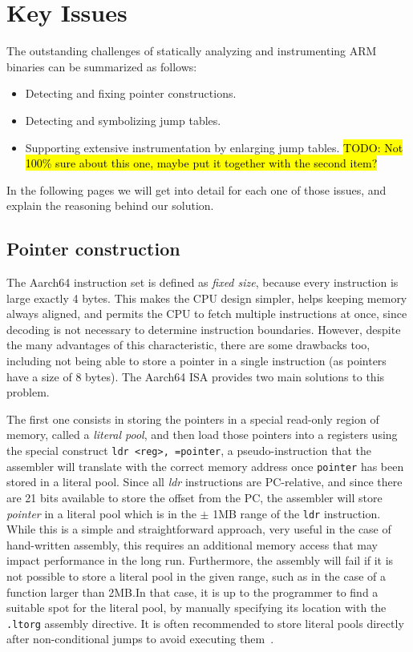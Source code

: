 \documentclass[a4paper,11pt,oneside]{report}
\newcommand{\todo}[1]{%
	\begingroup 
	\sethlcolor{cyan}%
	\hl{TODO: #1}%
	\endgroup
}
\begin{document}
\section{Key Issues}
The outstanding challenges of statically analyzing and instrumenting ARM 
binaries can be summarized as follows:

\begin{itemize}
	\item Detecting and fixing pointer constructions.
	\item Detecting and symbolizing jump tables.
	\item Supporting extensive instrumentation by enlarging jump tables.  
		\todo{Not 100\% sure about this one, maybe put it together with the 
		second item?}
\end{itemize}

In the following pages we will get into detail for each one of those issues, 
and explain the reasoning behind our solution.

\subsection{Pointer construction}
The Aarch64 instruction set is defined as \emph{fixed size}, because every 
instruction is large exactly 4 bytes. This makes the CPU design simpler,
helps keeping memory always aligned, and permits the CPU to fetch multiple 
instructions at once, since decoding is not necessary to determine instruction 
boundaries. However, despite the many advantages of this characteristic, there 
are some drawbacks too, including not being able to store a pointer in a single 
instruction (as pointers have a size of 8 bytes). The Aarch64 ISA provides two 
main solutions to this problem. 

The first one consists in storing the pointers in a special read-only region of 
memory, called a \emph{literal pool}, and then load those pointers into a 
registers using the special construct \texttt{ldr <reg>, =pointer}, a 
pseudo-instruction that the assembler will translate with the correct memory 
address once \texttt{pointer} has been stored in a literal pool.  Since all 
\emph{ldr} instructions are PC-relative, and since there are 21 bits available 
to store the offset from the PC, the assembler will store \emph{pointer} in a 
literal pool which is in the $\pm$ 1MB range of the \texttt{ldr} instruction.  
While this is a simple and straightforward approach, very useful in the case of 
hand-written assembly, this requires an additional memory access that may 
impact performance in the long run. Furthermore, the assembly will fail if it 
is not possible to store a literal pool in the given range, such as in the case 
of a function larger than 2MB.\@ In that case, it is up to the programmer to 
find a suitable spot for the literal pool, by manually specifying its location 
with the \texttt{.ltorg} assembly directive. It is often recommended to store 
literal pools directly after non-conditional jumps to avoid executing 
them~\cite{literalpools}.
\end{document}
